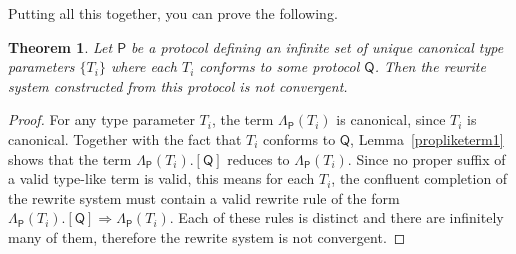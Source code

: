 \documentclass[headsepline,bibliography=totoc]{scrreport}
\newcommand{\proto}[1]{\bm{\mathsf{#1}}}
\newcommand{\protosym}[1]{[\proto{#1}]}
\newtheorem{theorem}{Theorem}[chapter]
\theoremstyle{definition}
\theoremstyle{definition}
\theoremstyle{definition}
\begin{document}
Putting all this together, you can prove the following.
\begin{theorem}\label{finiterqm} Let $\proto{P}$ be a protocol defining an infinite set of unique canonical type parameters $\{T_i\}$ where each $T_i$ conforms to some protocol $\proto{Q}$. Then the rewrite system constructed from this protocol is not convergent.
\end{theorem}
\begin{proof}
For any type parameter $T_i$, the term $\Lambda_{\proto{P}}(T_i)$ is canonical, since $T_i$ is canonical. Together with the fact that $T_i$ conforms to $\proto{Q}$, Lemma~\ref{propliketerm1} shows that the term $\Lambda_{\proto{P}}(T_i).\protosym{Q}$ reduces to $\Lambda_{\proto{P}}(T_i)$. Since no proper suffix of a valid type-like term is valid, this means for each $T_i$, the confluent completion of the rewrite system must contain a valid rewrite rule of the form $\Lambda_{\proto{P}}(T_i).\protosym{Q}\Rightarrow \Lambda_{\proto{P}}(T_i)$. Each of these rules is distinct and there are infinitely many of them, therefore the rewrite system is not convergent.
\end{proof}
\end{document}

